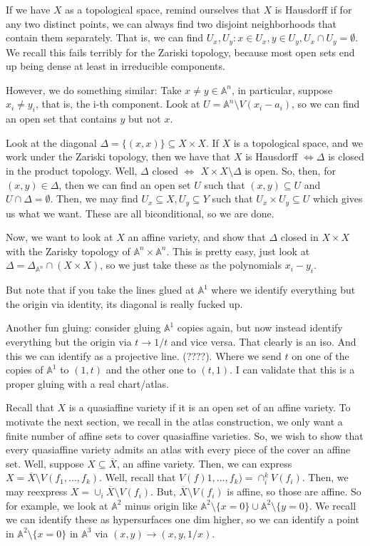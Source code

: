 \documentclass[10pt]{article}
\begin{document}
If we have $X$ as a topological space, remind ourselves that $X$ is Hausdorff if for any two distinct points, we can always find two disjoint neighborhoods that contain them separately. That is, we can find $U_x, U_y : x \in U_x, y \in U_y, U_x \cap U_y = \emptyset$. We recall this fails terribly for the Zariski topology, because most open sets end up being dense at least in irreducible components.

However, we do something similar: Take $x \not = y \in \mathbb{A}^n$, in particular, suppose $x_i \not = y_i$, that is, the i-th component. Look at $U = \mathbb{A}^n \setminus V(x_i - a_i)$, so we can find an open set that contains $y$ but not $x$.

Look at the diagonal $\Delta = \{ (x,x) \} \subseteq X \times X$. If $X$ is a topological space, and we work under the Zariski topology, then we have that $X$ is Hausdorff $\iff \Delta$ is closed in the product topology. Well, $\Delta$ closed $\iff$ $X \times X \setminus \Delta$ is open. So, then, for $(x,y) \in \Delta$, then we can find an open set $U$ such that $(x,y) \subseteq U$ and $U \cap \Delta = \emptyset$. Then, we may find $U_x \subseteq X, U_y \subseteq Y$ such that $U_x \times U_y \subseteq U$ which gives us what we want. These are all biconditional, so we are done.

Now, we want to look at $X$ an affine variety, and show that $\Delta$ closed in $X \times X$ with the Zarisky topology of $\mathbb{A}^n \times \mathbb{A}^n$. This is pretty easy, just look at $\Delta = \Delta_{\mathbb{A}^n} \cap (X \times X)$, so we just take these as the polynomials $x_i - y_i$. 

But note that if you take the lines glued at $\mathbb{A}^1$ where we identify everything but the origin via identity, its diagonal is really fucked up.

Another fun gluing: consider gluing $\mathbb{A}^1$ copies again, but now instead identify everything but the origin via $t  \to 1/t$ and vice versa. That clearly is an iso. And this we can identify as a projective line. (????). Where we send $t$ on one of the copies of $\mathbb{A}^1$ to $(1,t)$ and the other one to $(t,1)$. I can validate that this is a proper gluing with a real chart/atlas.

Recall that $X$ is a quasiaffine variety if it is an open set of an affine variety. To motivate the next section, we recall in the atlas construction, we only want a finite number of affine sets to cover quasiaffine varieties. So, we wish to show that every quasiaffine variety admits an atlas with every piece of the cover an affine set. Well, suppose $X \subseteq \overline{X}$, an affine variety. Then, we can express $X = \overline{X} \setminus V(f_1,...,f_k)$. Well, recall that $V(f)1,...,f_k) = \cap_i^k V(f_i)$. Then, we may reexpress $X = \cup_i \overline{X} \setminus V(f_i)$. But, $\overline{X} \setminus V(f_i)$ is affine, so those are affine. So for example, we look at $\mathbb{A}^2$ minus origin like $\mathbb{A}^2 \setminus \{ x = 0 \} \cup \mathbb{A}^2 \setminus \{ y = 0 \}$.  We recall we can identify these as hypersurfaces one dim higher, so we can identify a point in $\mathbb{A}^2 \setminus \{ x =0 \}$ in $\mathbb{A}^3$ via $(x,y) \to (x,y,1/x)$. 
\end{document}
